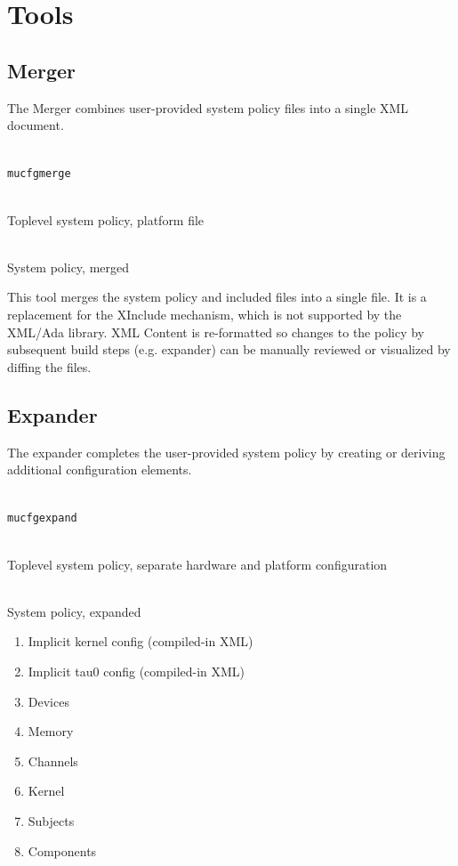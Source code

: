 \documentclass[a4paper,twoside,titlepage]{article}
\begin{document}
\section{Tools}
\label{sec:tools}

\subsection{Merger}
The Merger combines user-provided system policy files into a single XML
document.

\begin{description} \itemsep1pt \parskip0pt
	\item[Name] \hfill \\
		\texttt{mucfgmerge}
	\item[Input] \hfill \\
		Toplevel system policy, platform file
	\item[Output] \hfill \\
		System policy, merged
\end{description}

This tool merges the system policy and included files into a single file. It is
a replacement for the XInclude mechanism, which is not supported by the XML/Ada
library. XML Content is re-formatted so changes to the policy by subsequent
build steps (e.g. expander) can be manually reviewed or visualized by diffing
the files.

\subsection{Expander}
The expander completes the user-provided system policy by creating or deriving
additional configuration elements.

\begin{description} \itemsep1pt \parskip0pt
	\item[Name] \hfill \\
		\texttt{mucfgexpand}
	\item[Input] \hfill \\
		Toplevel system policy, separate hardware and platform configuration
	\item[Output] \hfill \\
		System policy, expanded
	\item[Data] \hfill
		\begin{enumerate}
			\item Implicit kernel config (compiled-in XML)
			\item Implicit tau0 config (compiled-in XML)
			\item Devices
			\item Memory
			\item Channels
			\item Kernel
			\item Subjects
			\item Components
		\end{enumerate}
\end{description}
\end{document}
